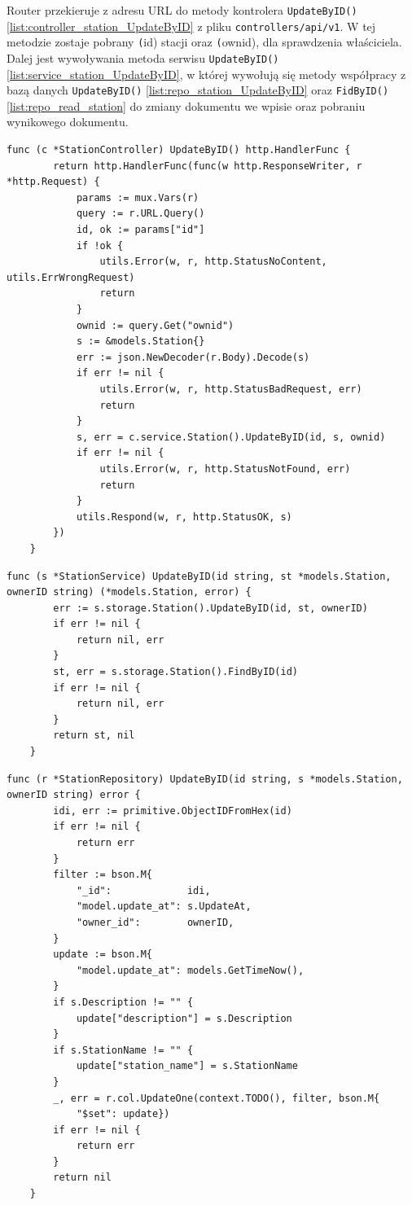 Router przekieruje z adresu URL do metody kontrolera \texttt{UpdateByID()} \ref{list:controller_station_UpdateByID} z pliku \texttt{controllers/api/v1}. W tej metodzie zostaje pobrany \texttt(id) stacji oraz \texttt(ownid), dla sprawdzenia właściciela.
Dalej jest wywoływania metoda serwisu \texttt{UpdateByID()} \ref{list:service_station_UpdateByID}, w której wywołują się metody współpracy z bazą danych \texttt{UpdateByID()} \ref{list:repo_station_UpdateByID} oraz \texttt{FidByID()} \ref{list:repo_read_station} do zmiany dokumentu we wpisie oraz pobraniu wynikowego dokumentu.
\begin{lstlisting}[label=list:controller_station_UpdateByID,caption=Kontroler edycji stacji ładowniczej,basicstyle=\tiny\ttfamily]
    func (c *StationController) UpdateByID() http.HandlerFunc {
        return http.HandlerFunc(func(w http.ResponseWriter, r *http.Request) {
            params := mux.Vars(r)
            query := r.URL.Query()
            id, ok := params["id"]
            if !ok {
                utils.Error(w, r, http.StatusNoContent, utils.ErrWrongRequest)
                return
            }
            ownid := query.Get("ownid")
            s := &models.Station{}
            err := json.NewDecoder(r.Body).Decode(s)
            if err != nil {
                utils.Error(w, r, http.StatusBadRequest, err)
                return
            }
            s, err = c.service.Station().UpdateByID(id, s, ownid)
            if err != nil {
                utils.Error(w, r, http.StatusNotFound, err)
                return
            }
            utils.Respond(w, r, http.StatusOK, s)
        })
    }
\end{lstlisting}
\begin{lstlisting}[label=list:service_station_UpdateByID,caption=Serwis edycji stacji ładowniczej,basicstyle=\tiny\ttfamily]
    func (s *StationService) UpdateByID(id string, st *models.Station, ownerID string) (*models.Station, error) {
        err := s.storage.Station().UpdateByID(id, st, ownerID)
        if err != nil {
            return nil, err
        }
        st, err = s.storage.Station().FindByID(id)
        if err != nil {
            return nil, err
        }
        return st, nil
    }
\end{lstlisting}
\begin{lstlisting}[label=list:repo_station_UpdateByID,caption=Edycja stacji ładowniczej w bazie danych,basicstyle=\tiny\ttfamily]
    func (r *StationRepository) UpdateByID(id string, s *models.Station, ownerID string) error {
        idi, err := primitive.ObjectIDFromHex(id)
        if err != nil {
            return err
        }
        filter := bson.M{
            "_id":             idi,
            "model.update_at": s.UpdateAt,
            "owner_id":        ownerID,
        }
        update := bson.M{
            "model.update_at": models.GetTimeNow(),
        }
        if s.Description != "" {
            update["description"] = s.Description
        }
        if s.StationName != "" {
            update["station_name"] = s.StationName
        }
        _, err = r.col.UpdateOne(context.TODO(), filter, bson.M{
            "$set": update})
        if err != nil {
            return err
        }
        return nil
    }
\end{lstlisting}

